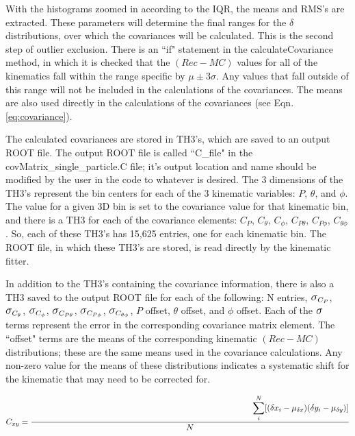 \documentclass[showpacs,amsmath,amssymb,aps,prc,floatfix,showkeys,nofootinbib]{revtex4-1}
\begin{document}
With the histograms zoomed in according to the IQR, the means and RMS's are extracted. These parameters will determine the final ranges for the $\delta$ distributions, over which the covariances will be calculated. This is the second step of outlier exclusion. There is an ``if" statement in the calculateCovariance method, in which it is checked that the $(Rec-MC)$ values for all of the kinematics fall within the range specific by $\mu\pm3\sigma$. Any values that fall outside of this range will not be included in the calculations of the covariances.  The means are also used directly in the calculations of the covariances (see Eqn. \ref{eq:covariance}).

The calculated covariances are stored in TH3's, which are saved to an output ROOT file. The output ROOT file is called ``C\_file" in the covMatrix\_single\_particle.C file; it's output location and name should be modified by the user in the code to whatever is desired. The 3 dimensions of the TH3's represent the bin centers for each of the 3 kinematic variables: $P$, $\theta$, and $\phi$. The value for a given 3D bin is set to the covariance value for that kinematic bin, and there is a TH3 for each of the covariance elements: $C_P$, $C_\theta$, $C_\phi$, $C_{P\theta}$, $C_{P\phi}$, $C_{\theta\phi}$. So, each of these TH3's has 15,625 entries, one for each kinematic bin. The ROOT file, in which these TH3's are stored, is read directly by the kinematic fitter.

In addition to the TH3's containing the covariance information, there is also a TH3 saved to the output ROOT file for each of the following: N entries, $\mathlarger{\mathlarger{\sigma}}_{C_{P}}$, $\mathlarger{\mathlarger{\sigma}}_{C_{\theta}}$, $\mathlarger{\mathlarger{\sigma}}_{C_{\phi}}$, $\mathlarger{\mathlarger{\sigma}}_{C_{P\theta}}$, $\mathlarger{\mathlarger{\sigma}}_{C_{P\phi}}$, $\mathlarger{\mathlarger{\sigma}}_{C_{\theta\phi}}$, $P$ offset, $\theta$ offset, and $\phi$ offset. Each of the $\mathlarger{\mathlarger{\sigma}}$ terms represent the error in the corresponding covariance matrix element. The ``offset" terms are the means of the corresponding kinematic $(Rec-MC)$ distributions; these are the same means used in the covariance calculations. Any non-zero value for the means of these distributions indicates a systematic shift for the kinematic that may need to be corrected for.

\begin{equation} \label{eq:covariance}
C_{xy}=\frac{\smashoperator[r]\sum_{i}^{N}[(\delta x_i-\mu_{\delta x})(\delta y_i-\mu_{\delta y})]}{N}
\end{equation}
\end{document}
